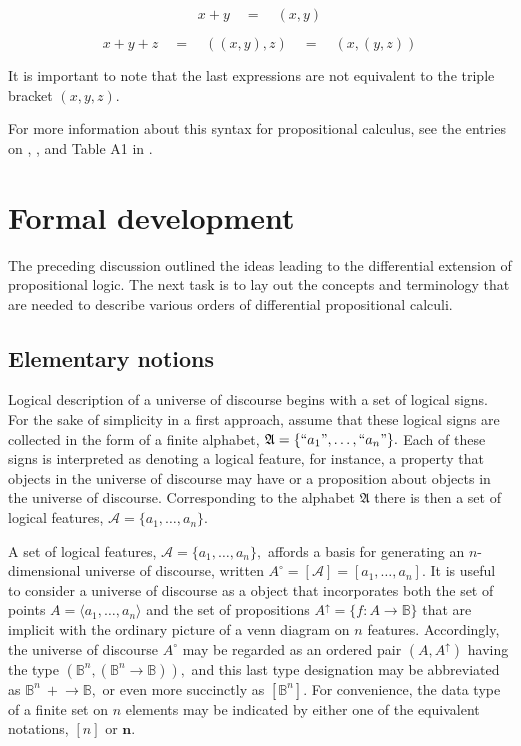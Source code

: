 \documentclass[12pt]{article}
\begin{document}
$$ x + y \quad = \quad (x, y)$$

$$x + y + z \quad = \quad ((x, y), z) \quad = \quad (x, (y, z))$$

It is important to note that the last expressions are not equivalent to the triple bracket $(x, y, z).$

For more information about this syntax for propositional calculus, see the entries on , , and Table A1 in .

\section{Formal development}

The preceding discussion outlined the ideas leading to the differential extension of propositional logic.  The next task is to lay out the concepts and terminology that are needed to describe various orders of differential propositional calculi.

\subsection{Elementary notions}

Logical description of a universe of discourse begins with a set of logical signs.  For the sake of simplicity in a first approach, assume that these logical signs are collected in the form of a finite alphabet, $\mathfrak{A} = \{ ``a_1", \ldots, ``a_n" \}.$  Each of these signs is interpreted as denoting a logical feature, for instance, a property that objects in the universe of discourse may have or a proposition about objects in the universe of discourse.  Corresponding to the alphabet $\mathfrak{A}$ there is then a set of logical features, $\mathcal{A} = \{ a_1, \ldots, a_n \}.$

A set of logical features, $\mathcal{A} = \{ a_1, \ldots, a_n \},$ affords a basis for generating an $n$-dimensional universe of discourse, written $A^\circ = [ \mathcal{A} ] = [ a_1, \ldots, a_n ].$  It is useful to consider a universe of discourse as a  object that incorporates both the set of points $A = \langle a_1, \ldots, a_n \rangle$ and the set of propositions $A^\uparrow = \{ f : A \to \mathbb{B} \}$ that are implicit with the ordinary picture of a venn diagram on $n$ features.  Accordingly, the universe of discourse $A^\circ$ may be regarded as an ordered pair $(A, A^\uparrow)$ having the type $(\mathbb{B}^n, (\mathbb{B}^n \to \mathbb{B})),$ and this last type designation may be abbreviated as $\mathbb{B}^n\ +\!\to \mathbb{B},$ or even more succinctly as $[ \mathbb{B}^n ].$  For convenience, the data type of a finite set on $n$ elements may be indicated by either one of the equivalent notations, $[n]$ or $\mathbf{n}.$
\end{document}
